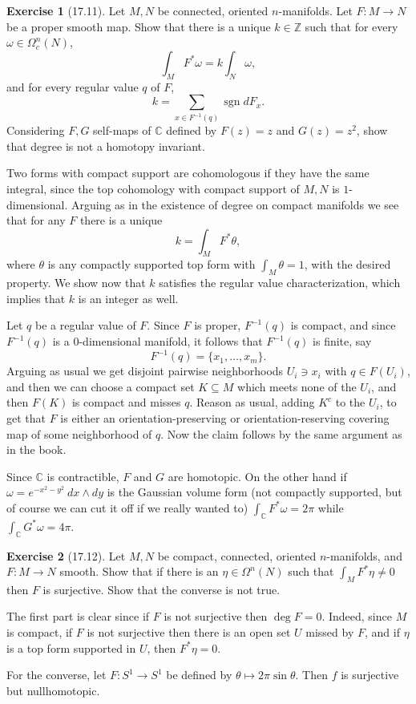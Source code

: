 \documentclass[10pt]{article}
\newcommand{\ZZ}{\mathbb{Z}}
\newcommand{\CC}{\mathbb{C}}
\newcommand{\sgn}{\operatorname{sgn}}
\theoremstyle{definition}
\newtheorem{exer}{Exercise}
\begin{document}
\begin{exer}[17.11]
Let $M, N$ be connected, oriented $n$-manifolds. Let $F: M \to N$ be a proper smooth map. Show that there is a unique $k \in \ZZ$ such that for every $\omega \in \Omega^n_c(N)$,
$$\int_M F^*\omega = k\int_N \omega,$$
and for every regular value $q$ of $F$,
$$k = \sum_{x \in F^{-1}(q)} \sgn dF_x.$$
Considering $F,G$ self-maps of $\CC$ defined by $F(z) = z$ and $G(z) = z^2$, show that degree is not a homotopy invariant.
\end{exer}

Two forms with compact support are cohomologous if they have the same integral, since the top cohomology with compact support of $M, N$ is $1$-dimensional.
Arguing as in the existence of degree on compact manifolds we see that for any $F$ there is a unique
$$k = \int_M F^*\theta,$$
where $\theta$ is any compactly supported top form with $\int_M \theta = 1$, with the desired property.
We show now that $k$ satisfies the regular value characterization, which implies that $k$ is an integer as well.

Let $q$ be a regular value of $F$. Since $F$ is proper, $F^{-1}(q)$ is compact, and since $F^{-1}(q)$ is a $0$-dimensional manifold, it follows that $F^{-1}(q)$ is finite, say
$$F^{-1}(q) = \{x_1, \dots, x_m\}.$$
Arguing as usual we get disjoint pairwise neighborhoods $U_i \ni x_i$ with $q \in F(U_i)$, and then we can choose a compact set $K \subseteq M$ which meets none of the $U_i$, and then $F(K)$ is compact and misses $q$.
Reason as usual, adding $K^c$ to the $U_i$, to get that $F$ is either an orientation-preserving or orientation-reserving covering map of some neighborhood of $q$.
Now the claim follows by the same argument as in the book.

Since $\CC$ is contractible, $F$ and $G$ are homotopic. On the other hand if $\omega = e^{-x^2-y^2}~dx\wedge dy$ is the Gaussian volume form (not compactly supported, but of course we can cut it off if we really wanted to) $\int_\CC F^*\omega = 2\pi$ while $\int_\CC G^*\omega = 4\pi$.

\begin{exer}[17.12]
Let $M,N$ be compact, connected, oriented $n$-manifolds, and $F: M \to N$ smooth.
Show that if there is an $\eta \in \Omega^n(N)$ such that $\int_M F^*\eta \neq 0$ then $F$ is surjective.
Show that the converse is not true.
\end{exer}

The first part is clear since if $F$ is not surjective then $\deg F = 0$.
Indeed, since $M$ is compact, if $F$ is not surjective then there is an open set $U$ missed by $F$, and if $\eta$ is a top form supported in $U$, then $F^*\eta = 0$.

For the converse, let $F: S^1 \to S^1$ be defined by $\theta \mapsto 2\pi\sin \theta$.
Then $f$ is surjective but nullhomotopic.
\end{document}
